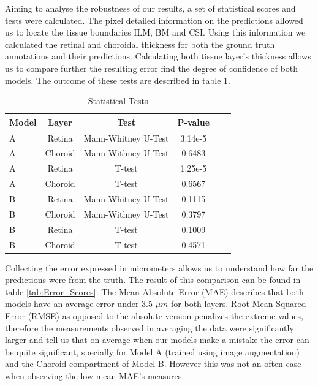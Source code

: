 \documentclass[12pt,a4paper]{scrartcl}
\begin{document}
Aiming to analyse the robustness of our results, a set of statistical scores and tests were calculated. The pixel detailed information on the predictions allowed us to locate the tissue boundaries ILM, BM and CSI. Using this information we calculated the retinal and choroidal thickness for both the ground truth annotations and their predictions. Calculating both tissue layer's thickness allows us to compare further the resulting error find the degree of confidence of both models. The outcome of these tests are described in table \ref{tab:statistical_tests}.
\begin{table}[H]
    \begin{tabular}{l c|c|c|c|c}
         \textbf{Model} &\textbf{Layer} & \textbf{Test}& \textbf{P-value}  \\
         \hline
         A & Retina & Mann-Whitney U-Test & 3.14e-5 \\
         A & Choroid & Mann-Withney U-Test & 0.6483 \\
         A & Retina & T-test & 1.25e-5 \\
         A & Choroid & T-test & 0.6567 \\
         B & Retina & Mann-Whitney U-Test & 0.1115 \\
         B & Choroid & Mann-Withney U-Test & 0.3797 \\
         B & Retina & T-test & 0.1009 \\
         B & Choroid & T-test & 0.4571
    \end{tabular}
    \caption{Statistical Tests}
    \label{tab:statistical_tests}
\end{table}

Collecting the error expressed in micrometers allows us to understand how far the predictions were from the truth. The result of this comparison can be found in table \ref{tab:Error_Scores}. The Mean Absolute Error (MAE) describes  that both models have an average error under 3.5 $\mu m$ for both layers. Root Mean Squared Error (RMSE) as opposed to the absolute version penalizes the extreme values, therefore the measurements observed in averaging the data were significantly larger and tell us that on average when our models make a mistake the error can be quite significant, specially for Model A (trained using image augmentation) and the Choroid compartment of Model B. However this was not an often case when observing the low mean MAE's measures.
\end{document}
